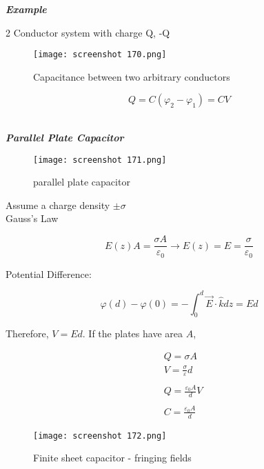 \documentclass[svgnames]{article}   	%
\begin{document}
\noindent \textit{ \textbf{Example}}

2 Conductor system with charge Q, -Q


\begin{figure}[H]
  \centering
    \texttt{[image: screenshot 170.png]}
    \caption{Capacitance between two arbitrary conductors }
\end{figure}



\begin{tcolorbox}[colback = blue!5!white, colframe = blue!50!black, title
  = Capacitance]
  
  \[
  Q = C (\varphi_2 - \varphi_1) = CV
  \]
  
  

\end{tcolorbox} \mbox{} \\

\noindent \textit{ \textbf{Parallel Plate Capacitor}}

\begin{figure}[H]
  \centering
    \texttt{[image: screenshot 171.png]}
    \caption{parallel plate capacitor}
\end{figure}


Assume a charge density $\pm \sigma$ \mbox{} \\

Gauss's Law 

\[
E(z) A = \frac{\sigma A}{\varepsilon_0} \rightarrow E(z)
= E = \frac{\sigma}{\varepsilon_0}
\] \vspace{5px} 

Potential Difference: 

\[
  \varphi(d) - \varphi(0) = -\int_0^d \vec{E} \cdot \hat{k} dz = E d
\] \vspace{5px}

Therefore, $V = E d$. If the plates have area  $A$, 

\begin{align*}
  & Q = \sigma A \\ 
  & V = \frac{\sigma}{\varepsilon}d \\\\
  & Q = \frac{\varepsilon_0 A}{d}V \\\\
  & C = \frac{\varepsilon_0 A}{d}
\end{align*}

\begin{figure}[H]
  \centering
    \texttt{[image: screenshot 172.png]}
    \caption{Finite sheet capacitor - fringing fields}
\end{figure}
\end{document}
